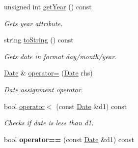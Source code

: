 \begin{DoxyCompactItemize}
unsigned int \hyperlink{class_date_a6561cf495bd6b7e6c747420d7ae9cc12}{get\+Year} () const 
\begin{DoxyCompactList}\small\item\em Gets year attribute. \end{DoxyCompactList}\item 
string \hyperlink{class_date_a78a793b6c55bb043789b09b1d74c1847}{to\+String} () const 
\begin{DoxyCompactList}\small\item\em Gets date in format day/month/year. \end{DoxyCompactList}\item 
\hyperlink{class_date}{Date} \& \hyperlink{class_date_a6835b4cfb6a3034a8daa0168c4e9d614}{operator=} (\hyperlink{class_date}{Date} rhs)
\begin{DoxyCompactList}\small\item\em \hyperlink{class_date}{Date} assignment operator. \end{DoxyCompactList}\item 
bool \hyperlink{class_date_a87040bf905b9491840c6cf9856128903}{operator$<$} (const \hyperlink{class_date}{Date} \&d1) const 
\begin{DoxyCompactList}\small\item\em Checks if date is less than d1. \end{DoxyCompactList}\item 
\hypertarget{class_date_ab7c7537fdf1ea999e4224a9e6b74f844}{}bool {\bfseries operator==} (const \hyperlink{class_date}{Date} \&d1) const \label{class_date_ab7c7537fdf1ea999e4224a9e6b74f844}

\end{DoxyCompactItemize}
